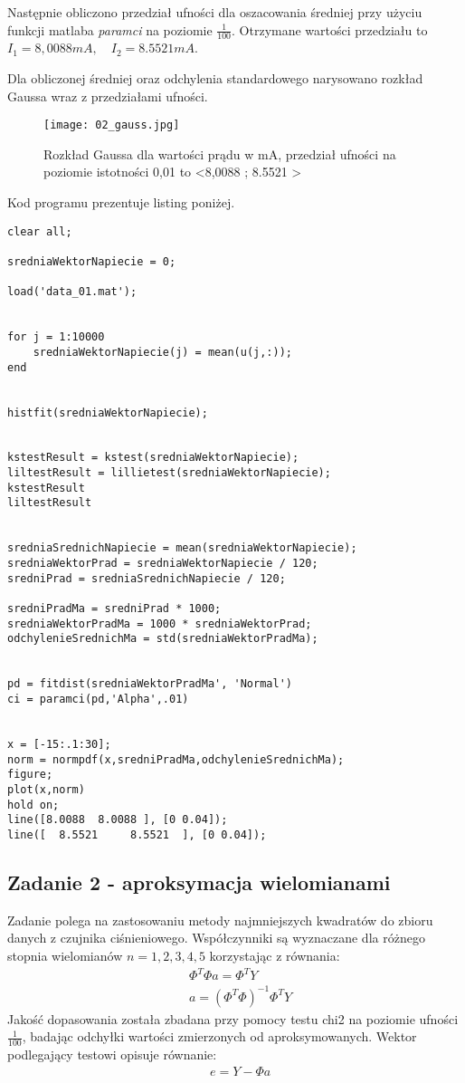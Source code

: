 \documentclass[a4paper,15pt]{article}
\begin{document}
Następnie obliczono przedział ufności dla oszacowania średniej przy użyciu funkcji matlaba \textit{paramci} na poziomie \( \frac{1}{100} \). Otrzymane wartości przedziału to \( I_1 = 8,0088 mA, \quad I_2 = 8.5521 mA \). 

Dla obliczonej średniej oraz odchylenia standardowego narysowano rozkład Gaussa wraz z przedziałami ufności. 

\begin{figure}[H]
\centerline{\texttt{[image: 02\_gauss.jpg]}}
\centering
\caption{Rozkład Gaussa dla wartości prądu w mA, przedział ufności na poziomie istotności 0,01 to <8,0088 ;  8.5521 > }
\label{fig:02_gauss}
\end{figure}

Kod programu prezentuje listing poniżej.
\begin{lstlisting}[caption=Zadanie 1, captionpos=b,label=lis1, firstnumber=1,frame=single]
clear all;

sredniaWektorNapiecie = 0; 

load('data_01.mat');


for j = 1:10000 
    sredniaWektorNapiecie(j) = mean(u(j,:));
end


histfit(sredniaWektorNapiecie);


kstestResult = kstest(sredniaWektorNapiecie);
liltestResult = lillietest(sredniaWektorNapiecie);
kstestResult
liltestResult


sredniaSrednichNapiecie = mean(sredniaWektorNapiecie);
sredniaWektorPrad = sredniaWektorNapiecie / 120;
sredniPrad = sredniaSrednichNapiecie / 120;

sredniPradMa = sredniPrad * 1000;
sredniaWektorPradMa = 1000 * sredniaWektorPrad;
odchylenieSrednichMa = std(sredniaWektorPradMa);


pd = fitdist(sredniaWektorPradMa', 'Normal')
ci = paramci(pd,'Alpha',.01)


x = [-15:.1:30];
norm = normpdf(x,sredniPradMa,odchylenieSrednichMa);
figure;
plot(x,norm)
hold on;
line([8.0088  8.0088 ], [0 0.04]);
line([  8.5521     8.5521  ], [0 0.04]);

\end{lstlisting}




\subsection{Zadanie 2 - aproksymacja wielomianami }

Zadanie polega na zastosowaniu metody najmniejszych kwadratów do zbioru danych z czujnika ciśnieniowego. Współczynniki są wyznaczane dla różnego stopnia wielomianów \( n = 1,2,3,4,5 \) korzystając z równania:
\begin{align*}
& \Phi ^T\Phi a=\Phi ^T Y \\
& a = ( \Phi ^T\Phi ) ^ {-1} \Phi ^T Y
\end{align*}
Jakość dopasowania została zbadana przy pomocy testu chi2 na poziomie ufności \( \frac{1}{100} \), badając odchyłki wartości zmierzonych od aproksymowanych. Wektor podlegający testowi opisuje równanie:
\begin{align*}
& e = Y - \Phi a
\end{align*}
\end{document}
